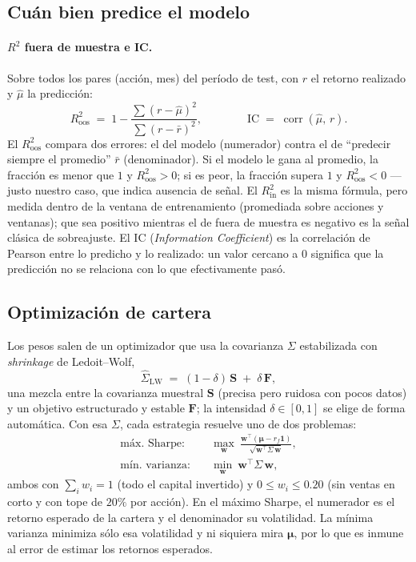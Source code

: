 \documentclass[11pt]{article}
\begin{document}
\subsection*{Cuán bien predice el modelo}
 
\paragraph{$R^2$ fuera de muestra e IC.} Sobre todos los pares (acción, mes) del período de test, con
$r$ el retorno realizado y $\hat{\mu}$ la predicción:
\[
R^2_{\text{oos}} \;=\; 1 - \frac{\sum (r-\hat{\mu})^2}{\sum (r-\bar{r})^2},
\qquad\qquad
\text{IC} \;=\; \operatorname{corr}(\hat{\mu},\,r).
\]
El $R^2_{\text{oos}}$ compara dos errores: el del modelo (numerador) contra el de ``predecir siempre
el promedio'' $\bar{r}$ (denominador). Si el modelo le gana al promedio, la fracción es menor que $1$
y $R^2_{\text{oos}}>0$; si es peor, la fracción supera $1$ y $R^2_{\text{oos}}<0$ ---justo nuestro
caso, que indica ausencia de señal. El $R^2_{\text{in}}$ es la misma fórmula, pero medida dentro de la
ventana de entrenamiento (promediada sobre acciones y ventanas); que sea positivo mientras el de fuera
de muestra es negativo es la señal clásica de sobreajuste. El IC (\emph{Information Coefficient}) es la
correlación de Pearson entre lo predicho y lo realizado: un valor cercano a $0$ significa que la
predicción no se relaciona con lo que efectivamente pasó.
 
\subsection*{Optimización de cartera}
 
Los pesos salen de un optimizador que usa la covarianza $\Sigma$ estabilizada con \emph{shrinkage} de
Ledoit--Wolf,
\[
\hat{\Sigma}_{\text{LW}} \;=\; (1-\delta)\,\mathbf{S} \;+\; \delta\,\mathbf{F},
\]
una mezcla entre la covarianza muestral $\mathbf{S}$ (precisa pero ruidosa con pocos datos) y un
objetivo estructurado y estable $\mathbf{F}$; la intensidad $\delta\in[0,1]$ se elige de forma
automática. Con esa $\Sigma$, cada estrategia resuelve uno de dos problemas:
\[
\begin{aligned}
\text{máx.\ Sharpe:}&\quad \max_{\mathbf{w}}\ \frac{\mathbf{w}^{\top}(\boldsymbol{\mu}-r_f\mathbf{1})}
{\sqrt{\mathbf{w}^{\top}\Sigma\,\mathbf{w}}},\\[4pt]
\text{mín.\ varianza:}&\quad \min_{\mathbf{w}}\ \mathbf{w}^{\top}\Sigma\,\mathbf{w},
\end{aligned}
\]
ambos con $\sum_i w_i=1$ (todo el capital invertido) y $0\le w_i\le 0.20$ (sin ventas en corto y con
tope de $20\%$ por acción). En el máximo Sharpe, el numerador es el retorno esperado de la cartera y
el denominador su volatilidad. La mínima varianza minimiza sólo esa volatilidad y ni siquiera mira
$\boldsymbol{\mu}$, por lo que es inmune al error de estimar los retornos esperados.
\end{document}
